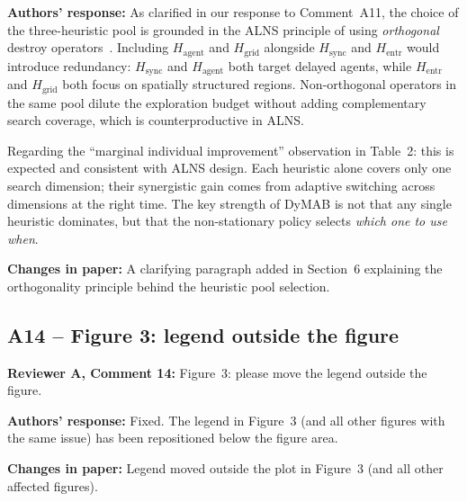 \documentclass[review]{jair}
\begin{document}
\begin{authorbox}
\textbf{Authors' response:} As clarified in our response to Comment~A11, the choice of the three-heuristic pool is grounded in the ALNS principle of using \emph{orthogonal} destroy operators~\citep{LNS2}. Including $H_{\text{agent}}$ and $H_{\text{grid}}$ alongside $H_{\text{sync}}$ and $H_{\text{entr}}$ would introduce redundancy: $H_{\text{sync}}$ and $H_{\text{agent}}$ both target delayed agents, while $H_{\text{entr}}$ and $H_{\text{grid}}$ both focus on spatially structured regions. Non-orthogonal operators in the same pool dilute the exploration budget without adding complementary search coverage, which is counterproductive in ALNS.

Regarding the ``marginal individual improvement'' observation in Table~2: this is expected and consistent with ALNS design. Each heuristic alone covers only one search dimension; their synergistic gain comes from adaptive switching across dimensions at the right time. The key strength of DyMAB is not that any single heuristic dominates, but that the non-stationary policy selects \emph{which one to use when}.
\end{authorbox}

\begin{changebox}
\textbf{Changes in paper:} A clarifying paragraph added in Section~6 explaining the orthogonality principle behind the heuristic pool selection.
\end{changebox}

\subsection*{A14 -- Figure 3: legend outside the figure}

\begin{reviewerbox}
\textbf{Reviewer A, Comment 14:} Figure~3: please move the legend outside the figure.
\end{reviewerbox}

\begin{authorbox}
\textbf{Authors' response:} Fixed. The legend in Figure~3 (and all other figures with the same issue) has been repositioned below the figure area.
\end{authorbox}

\begin{changebox}
\textbf{Changes in paper:} Legend moved outside the plot in Figure~3 (and all other affected figures).
\end{changebox}
\end{document}
